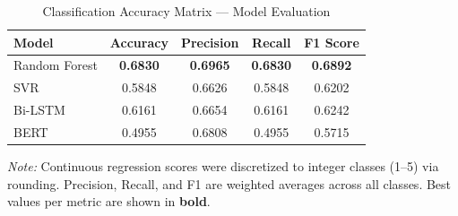 \begin{table}[htbp]
  \centering
  \caption{Classification Accuracy Matrix — Model Evaluation}
  \label{tab:classification_metrics}
  \begin{tabular}{lcccc}
    \toprule
    \textbf{Model} & \textbf{Accuracy} & \textbf{Precision} & \textbf{Recall} & \textbf{F1 Score} \\
    \midrule
    Random Forest & \textbf{0.6830} & \textbf{0.6965} & \textbf{0.6830} & \textbf{0.6892} \\
    SVR & 0.5848 & 0.6626 & 0.5848 & 0.6202 \\
    Bi-LSTM & 0.6161 & 0.6654 & 0.6161 & 0.6242 \\
    BERT & 0.4955 & 0.6808 & 0.4955 & 0.5715 \\
    \bottomrule
  \end{tabular}
  \vspace{4pt}
  \parbox{0.9\linewidth}{\footnotesize\textit{Note:} Continuous regression scores were discretized to integer classes (1--5) via rounding. Precision, Recall, and F1 are weighted averages across all classes. Best values per metric are shown in \textbf{bold}.}
\end{table}
